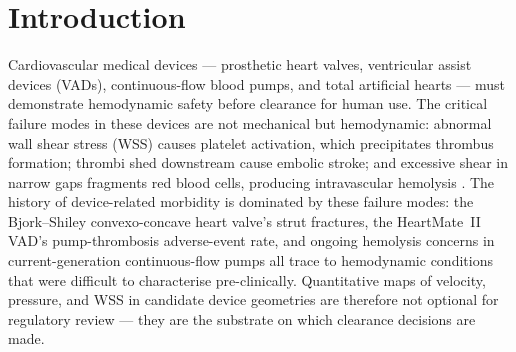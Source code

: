 \documentclass[12pt,a4paper]{article}
\newcommand{\DATA}[1]{{\color{orange}\textbf{[DATA:\;#1]}}}
\newcommand{\Reyn}{\mathrm{Re}}    %
\begin{document}
\begin{abstract}
Quantitatively, on the nozzle the framework attains relative-$L^2$
velocity error of $7.5\%$ at $\Reyn = 500$ and a Stewart~2012-style
global error metric $E_g = 0.137$ that is $2.5\times$ smaller than
the best CFD group in the 28-laboratory FDA inter-laboratory
study. On the pump diffuser the framework attains relative-$L^2$
velocity-magnitude error below $1.7\%$ across all five operating
conditions and peak-velocity capture above $98.8\%$. A
$3 \times 3$ hyperparameter-sensitivity study confirms that the
results are stable to network-width and data-weight choices
(min--max range \DATA{[abs.hp-range]}\%). Each benchmark case
trains in $11$--$26$~minutes on a single consumer-grade NVIDIA T4
GPU, a $5$--$30\times$ wall-clock speed-up relative to traditional
CFD on the same problems.

\medskip
\noindent\textbf{Keywords:} physics-informed neural networks,
incompressible Navier--Stokes equations, inverse problem,
mesh-free methods, particle image velocimetry, sparse
reconstruction, automatic differentiation, FDA Critical Path
nozzle benchmark, FDA Blood Pump benchmark, wall shear stress
\end{abstract}

\newpage

\section{Introduction}
\label{sec:intro}

Cardiovascular medical devices --- prosthetic heart valves,
ventricular assist devices (VADs), continuous-flow blood pumps,
and total artificial hearts --- must demonstrate hemodynamic
safety before clearance for human use. The critical failure
modes in these devices are not mechanical but hemodynamic:
abnormal wall shear stress (WSS) causes platelet activation,
which precipitates thrombus formation; thrombi shed downstream
cause embolic stroke; and excessive shear in narrow gaps
fragments red blood cells, producing intravascular hemolysis
\cite{Malek1999WSS, Shadden2013WSS}. The history of
device-related morbidity is dominated by these failure modes:
the Bjork--Shiley convexo-concave heart valve's strut
fractures, the HeartMate~II VAD's pump-thrombosis adverse-event
rate, and ongoing hemolysis concerns in current-generation
continuous-flow pumps all trace to hemodynamic conditions that
were difficult to characterise pre-clinically. Quantitative
maps of velocity, pressure, and WSS in candidate device
geometries are therefore not optional for regulatory review ---
they are the substrate on which clearance decisions are made.
\end{document}

